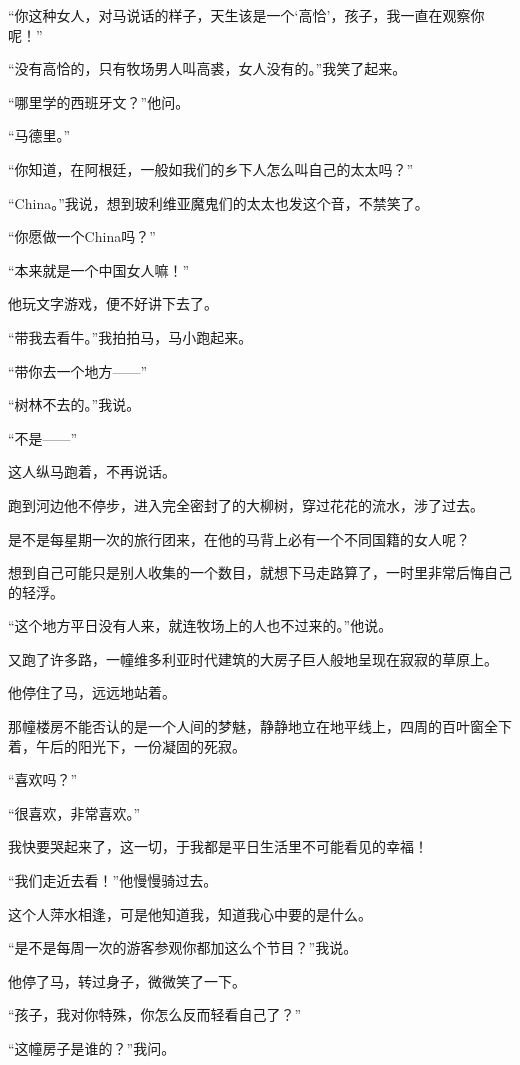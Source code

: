 \par “你这种女人，对马说话的样子，天生该是一个‘高恰’，孩子，我一直在观察你呢！”
\par “没有高恰的，只有牧场男人叫高裘，女人没有的。”我笑了起来。
\par “哪里学的西班牙文？”他问。
\par “马德里。”
\par “你知道，在阿根廷，一般如我们的乡下人怎么叫自己的太太吗？”
\par “China。”我说，想到玻利维亚魔鬼们的太太也发这个音，不禁笑了。
\par “你愿做一个China吗？”
\par “本来就是一个中国女人嘛！”
\par 他玩文字游戏，便不好讲下去了。
\par “带我去看牛。”我拍拍马，马小跑起来。
\par “带你去一个地方——”
\par “树林不去的。”我说。
\par “不是——”
\par 这人纵马跑着，不再说话。
\par 跑到河边他不停步，进入完全密封了的大柳树，穿过花花的流水，涉了过去。
\par 是不是每星期一次的旅行团来，在他的马背上必有一个不同国籍的女人呢？
\par 想到自己可能只是别人收集的一个数目，就想下马走路算了，一时里非常后悔自己的轻浮。
\par “这个地方平日没有人来，就连牧场上的人也不过来的。”他说。
\par 又跑了许多路，一幢维多利亚时代建筑的大房子巨人般地呈现在寂寂的草原上。
\par 他停住了马，远远地站着。
\par 那幢楼房不能否认的是一个人间的梦魅，静静地立在地平线上，四周的百叶窗全下着，午后的阳光下，一份凝固的死寂。
\par “喜欢吗？”
\par “很喜欢，非常喜欢。”
\par 我快要哭起来了，这一切，于我都是平日生活里不可能看见的幸福！
\par “我们走近去看！”他慢慢骑过去。
\par 这个人萍水相逢，可是他知道我，知道我心中要的是什么。
\par “是不是每周一次的游客参观你都加这么个节目？”我说。
\par 他停了马，转过身子，微微笑了一下。
\par “孩子，我对你特殊，你怎么反而轻看自己了？”
\par “这幢房子是谁的？”我问。
